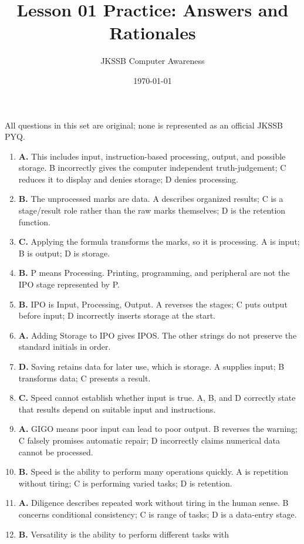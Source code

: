 \documentclass[11pt]{article}
\title{Lesson 01 Practice: Answers and Rationales}
\author{JKSSB Computer Awareness}
\date{\today}
\begin{document}
\maketitle
\noindent All questions in this set are original; none is represented as an
official JKSSB PYQ.
\begin{enumerate}[label=\textbf{Q\arabic*.}, leftmargin=*]
\item \textbf{A.} This includes input, instruction-based processing, output,
  and possible storage. B incorrectly gives the computer independent
  truth-judgement; C reduces it to display and denies storage; D denies
  processing.
\item \textbf{B.} The unprocessed marks are data. A describes organized
  results; C is a stage/result role rather than the raw marks themselves; D
  is the retention function.
\item \textbf{C.} Applying the formula transforms the marks, so it is
  processing. A is input; B is output; D is storage.
\item \textbf{B.} P means Processing. Printing, programming, and peripheral
  are not the IPO stage represented by P.
\item \textbf{B.} IPO is Input, Processing, Output. A reverses the stages; C
  puts output before input; D incorrectly inserts storage at the start.
\item \textbf{A.} Adding Storage to IPO gives IPOS. The other strings do not
  preserve the standard initials in order.
\item \textbf{D.} Saving retains data for later use, which is storage. A
  supplies input; B transforms data; C presents a result.
\item \textbf{C.} Speed cannot establish whether input is true. A, B, and D
  correctly state that results depend on suitable input and instructions.
\item \textbf{A.} GIGO means poor input can lead to poor output. B reverses
  the warning; C falsely promises automatic repair; D incorrectly claims
  numerical data cannot be processed.
\item \textbf{B.} Speed is the ability to perform many operations quickly. A
  is repetition without tiring; C is performing varied tasks; D is retention.
\item \textbf{A.} Diligence describes repeated work without tiring in the
  human sense. B concerns conditional consistency; C is range of tasks; D is
  a data-entry stage.
\item \textbf{B.} Versatility is the ability to perform different tasks with

\end{enumerate}
\end{document}
